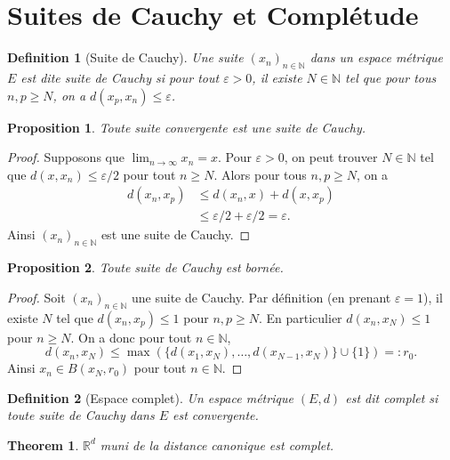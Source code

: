 \documentclass{article}
\newtheorem{theorem}{Theorem}
\newtheorem{proposition}{Proposition}
\newtheorem{definition}{Definition}
\begin{document}
\sloppy

\section{Suites de Cauchy et Complétude}

\begin{definition}[Suite de Cauchy]
Une suite $(x_n)_{n \in \mathbb{N}}$ dans un espace métrique $E$ est dite suite de Cauchy si pour tout $\varepsilon > 0$, il existe $N \in \mathbb{N}$ tel que pour tous $n, p \geq N$, on a $d(x_p, x_n) \leq \varepsilon$.
\end{definition}

\begin{proposition}
Toute suite convergente est une suite de Cauchy.
\end{proposition}
\begin{proof}
Supposons que $\lim_{n \to \infty} x_n = x$. Pour $\varepsilon > 0$, on peut trouver $N \in \mathbb{N}$ tel que $d(x, x_n) \leq \varepsilon/2$ pour tout $n \geq N$. Alors pour tous $n, p \geq N$, on a
\begin{align*}
d(x_n, x_p) &\leq d(x_n, x) + d(x, x_p) \\
&\leq \varepsilon/2 + \varepsilon/2 = \varepsilon.
\end{align*}
Ainsi $(x_n)_{n \in \mathbb{N}}$ est une suite de Cauchy.
\end{proof}

\begin{proposition}
Toute suite de Cauchy est bornée.
\end{proposition}
\begin{proof}
Soit $(x_n)_{n \in \mathbb{N}}$ une suite de Cauchy. Par définition (en prenant $\varepsilon = 1$), il existe $N$ tel que $d(x_n, x_p) \leq 1$ pour $n, p \geq N$. En particulier $d(x_n, x_N) \leq 1$ pour $n \geq N$. On a donc pour tout $n \in \mathbb{N}$,
$$d(x_n, x_N) \leq \max( \{d(x_1, x_N), \dots, d(x_{N-1}, x_N)\} \cup \{1\}) =: r_0.$$
Ainsi $x_n \in B(x_N, r_0)$ pour tout $n \in \mathbb{N}$.
\end{proof}

\begin{definition}[Espace complet]
Un espace métrique $(E, d)$ est dit complet si toute suite de Cauchy dans $E$ est convergente.
\end{definition}

\begin{theorem}
$\mathbb{R}^d$ muni de la distance canonique est complet.
\end{theorem}
\end{document}
